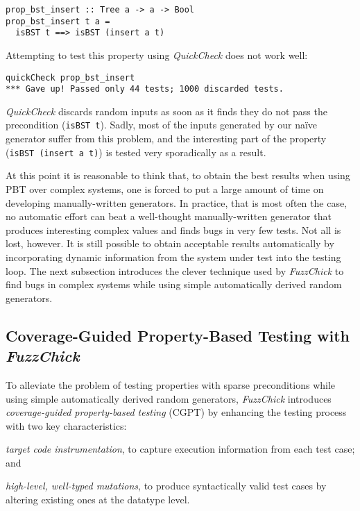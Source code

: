 \documentclass[acmsmall, anonymous]{acmart}
\newcommand{\quickcheck}{\textit{QuickCheck}\xspace}
\newcommand{\fuzzchick}{\textit{FuzzChick}\xspace}
\begin{document}
\begin{verbatim}
prop_bst_insert :: Tree a -> a -> Bool
prop_bst_insert t a =
  isBST t ==> isBST (insert a t)
\end{verbatim}

\noindent Attempting to test this property using \quickcheck does not work well:

\begin{verbatim}
quickCheck prop_bst_insert
*** Gave up! Passed only 44 tests; 1000 discarded tests.
\end{verbatim}

\noindent \quickcheck discards random inputs as soon as it finds they do not
pass the precondition (\texttt{isBST t}).
%
Sadly, most of the inputs generated by our na\"ive generator suffer from this
problem, and the interesting part of the property (\texttt{isBST (insert a t)})
is tested very sporadically as a result.


At this point it is reasonable to think that, to obtain the best results when
using PBT over complex systems, one is forced to put a large amount of time on
developing manually-written generators.
%
In practice, that is most often the case, no automatic effort can beat a
well-thought manually-written generator that produces interesting complex values
and finds bugs in very few tests.
%
Not all is lost, however.
%
It is still possible to obtain acceptable results automatically by incorporating
dynamic information from the system under test into the testing loop.
%
The next subsection introduces the clever technique used by \fuzzchick to find
bugs in complex systems while using simple automatically derived random
generators.


\subsection{Coverage-Guided Property-Based Testing with \fuzzchick}

To alleviate the problem of testing properties with sparse preconditions while
using simple automatically derived random generators, \fuzzchick introduces
\emph{coverage-guided property-based testing} (CGPT) by enhancing the testing
process with two key characteristics:
%
\begin{inparaenum}
\item \emph{target code instrumentation}, to capture execution information from
  each test case; and
\item \emph{high-level, well-typed mutations}, to produce syntactically valid
  test cases by altering existing ones at the datatype level.
\end{inparaenum}
\end{document}
